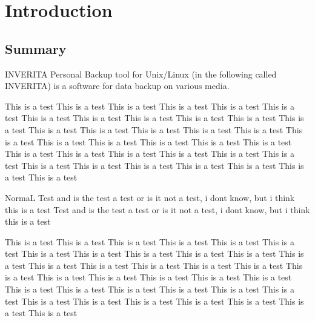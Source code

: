 %
%
%
%


\chapter{Introduction}

\section{Summary}
INVERITA Personal Backup tool for Unix/Linux (in the following called INVERITA)
is a software for data backup on various media.

\begin{info}
This is a test This is a test This is a test This is a test This is a test This is a test
This is a test This is a test This is a test This is a test This is a test This is a test
This is a test This is a test This is a test This is a test This is a test This is a test
This is a test This is a test This is a test This is a test This is a test This is a test
This is a test This is a test This is a test This is a test This is a test This is a test
This is a test This is a test This is a test This is a test This is a test This is a test
\end{info}

NormaL Test and is the test a test or is it not a test, i dont know, but i think this is a test
 Test and is the test a test or is it not a test, i dont know, but i think this is a test

\begin{warning}
This is a test This is a test This is a test This is a test This is a test This is a test
This is a test This is a test This is a test This is a test This is a test This is a test
This is a test This is a test This is a test This is a test This is a test This is a test
This is a test This is a test This is a test This is a test This is a test This is a test
This is a test This is a test This is a test This is a test This is a test This is a test
This is a test This is a test This is a test This is a test This is a test This is a test
\end{warning}


